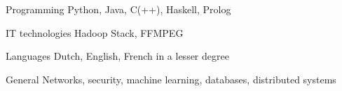 


\begin{cvskills}


\cvskill
{Programming} %
{Python, Java, C(++), Haskell, Prolog} %


\cvskill
{IT technologies} %
{Hadoop Stack, FFMPEG} %


\cvskill
{Languages} %
{Dutch, English, French in a lesser degree} %


\cvskill
{General} %
{Networks, security, machine learning, databases, distributed systems} %

\end{cvskills}